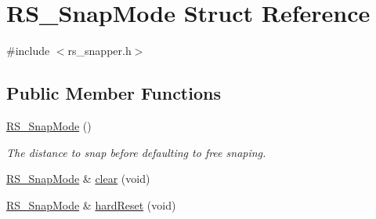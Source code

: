 \hypertarget{structRS__SnapMode}{\section{R\-S\-\_\-\-Snap\-Mode Struct Reference}
\label{structRS__SnapMode}
}


{\ttfamily \#include $<$rs\-\_\-snapper.\-h$>$}

\subsection*{Public Member Functions}
\begin{DoxyCompactItemize}
\item 
\hyperlink{structRS__SnapMode_a4bbf83b7ff9cc2b0b5bd1f1a70e151d0}{R\-S\-\_\-\-Snap\-Mode} ()
\begin{DoxyCompactList}\small\item\em The distance to snap before defaulting to free snaping. \end{DoxyCompactList}\item 
\hyperlink{structRS__SnapMode}{R\-S\-\_\-\-Snap\-Mode} \& \hyperlink{structRS__SnapMode_a022bf0cf13684bf3e1048cd6781d0d1a}{clear} (void)
\item 
\hyperlink{structRS__SnapMode}{R\-S\-\_\-\-Snap\-Mode} \& \hyperlink{structRS__SnapMode_a74926c5cc16792b5a5f85b8e713d6bbb}{hard\-Reset} (void)
\end{DoxyCompactItemize}
